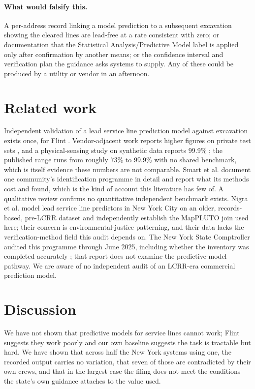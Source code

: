 \documentclass[11pt]{article}
\begin{document}
\paragraph{What would falsify this.}
A per-address record linking a model prediction to a subsequent excavation showing the cleared
lines are lead-free at a rate consistent with zero; or documentation that the
\textsf{Statistical Analysis/Predictive Model} label is applied only after confirmation by
another means; or the confidence interval and verification plan the guidance asks systems to
supply. Any of these could be produced by a utility or vendor in an afternoon.

\section{Related work}

Independent validation of a lead service line prediction model against excavation exists once,
for Flint \cite{goovaerts2023}. Vendor-adjacent work reports higher figures on private test
sets \cite{deheer2023}, and a physical-sensing study on synthetic data reports 99.9\%
\cite{acsest2026}; the published range runs from roughly 73\% to 99.9\% with no shared
benchmark, which is itself evidence these numbers are not comparable. Smart et al.
\cite{bennington2023} document one community's identification programme in detail and report
what its methods cost and found, which is the kind of account this literature has few of. A
qualitative review \cite{review2021} confirms no quantitative independent benchmark exists.
Nigra et al.
\cite{nigra2023} model lead service line predictors in New York City on an older,
records-based, pre-LCRR dataset and independently establish the MapPLUTO join used here; their
concern is environmental-justice patterning, and their data lacks the verification-method
field this audit depends on. The New York State Comptroller audited this programme through
June 2025, including whether the inventory was completed accurately \cite{osc2026}; that
report does not examine the predictive-model pathway. We are aware of no independent audit of
an LCRR-era commercial prediction model.

\section{Discussion}

We have not shown that predictive models for service lines cannot work; Flint suggests they
work poorly and our own baseline suggests the task is tractable but hard. We have shown that
across half the New York systems using one, the recorded output carries no variation, that
seven of those are contradicted by their own crews, and that in the largest case the filing
does not meet the conditions the state's own guidance attaches to the value used.
\end{document}
